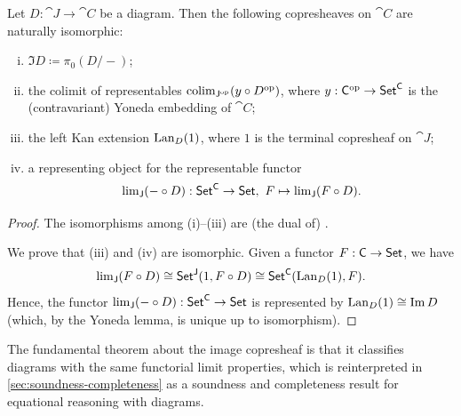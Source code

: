 \documentclass[11pt]{article}
\numberwithin{equation}{section}
\begin{document}
\begin{theorem}
  \label{thm:image-copresheaf}
  Let $D: \cat{J} \to \cat{C}$ be a diagram. Then the following copresheaves on
  $\cat{C}$ are naturally isomorphic:
  \begin{enumerate}[(i)]
    \item $\Im D \coloneqq \pi_0(D/-)$;
    \item the colimit of representables $\operatorname{colim}_{\mathsf{J}^{\mathrm{op}}} (y \circ D^{\mathrm{op}})$, where
      $y: \mathsf{C}^{\mathrm{op}} \to \mathsf{Set}^{\mathsf{C}}$ is the (contravariant) Yoneda embedding
      of $\cat{C}$;
    \item the left Kan extension $\operatorname{Lan}_D(1)$, where $1$ is the terminal copresheaf on $\cat{J}$;
    \item a representing object for the representable functor
      \begin{equation*}
        \textstyle \lim_{\mathsf{J}} (- \circ D):
          \mathsf{Set}^{\mathsf{C}} \to \mathsf{Set},\ F \mapsto \lim_{\mathsf{J}} (F \circ D).
      \end{equation*}
    \end{enumerate}
\end{theorem}
\begin{proof}
  The isomorphisms among (i)--(iii) are (the dual of) \cite[Theorem 2.1 and
  Corollary 2.8]{pare1973}.

  We prove that (iii) and (iv) are isomorphic. Given a functor
  $F: \mathsf{C} \to \mathsf{Set}$, we have
  \begin{equation*} \textstyle
    \lim_{\mathsf{J}} (F \circ D) \cong \mathsf{Set}^{\mathsf{J}}(1, F \circ D)
      \cong \mathsf{Set}^{\mathsf{C}}(\operatorname{Lan}_D(1), F).
  \end{equation*}
  Hence, the functor $\lim_{\mathsf{J}} (- \circ D): \mathsf{Set}^{\mathsf{C}} \to \mathsf{Set}$ is
  represented by $\operatorname{Lan}_D(1) \cong \operatorname{Im} D$ (which, by the Yoneda lemma, is unique
  up to isomorphism).
\end{proof}

The fundamental theorem about the image copresheaf is that it classifies
diagrams with the same functorial limit properties, which is reinterpreted in
\cref{sec:soundness-completeness} as a soundness and completeness result for
equational reasoning with diagrams.
\end{document}
